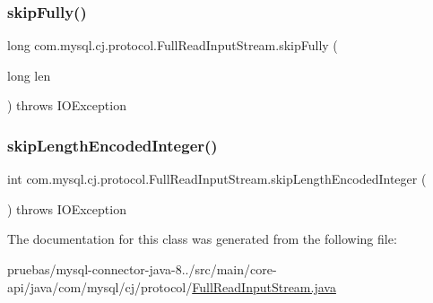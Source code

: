 \subsubsection{\texorpdfstring{skip\+Fully()}{skipFully()}}
{\footnotesize\ttfamily long com.\+mysql.\+cj.\+protocol.\+Full\+Read\+Input\+Stream.\+skip\+Fully (\begin{DoxyParamCaption}\item[{long}]{len }\end{DoxyParamCaption}) throws I\+O\+Exception}

\mbox{\label{classcom_1_1mysql_1_1cj_1_1protocol_1_1_full_read_input_stream_a2fbcd02fc93bec4299d52e1f795a043c}} 
\subsubsection{\texorpdfstring{skip\+Length\+Encoded\+Integer()}{skipLengthEncodedInteger()}}
{\footnotesize\ttfamily int com.\+mysql.\+cj.\+protocol.\+Full\+Read\+Input\+Stream.\+skip\+Length\+Encoded\+Integer (\begin{DoxyParamCaption}{ }\end{DoxyParamCaption}) throws I\+O\+Exception}



The documentation for this class was generated from the following file\+:\begin{DoxyCompactItemize}
\item 
pruebas/mysql-\/connector-\/java-\/8../src/main/core-\/api/java/com/mysql/cj/protocol/\mbox{\hyperlink{_full_read_input_stream_8java}{Full\+Read\+Input\+Stream.\+java}}\end{DoxyCompactItemize}
